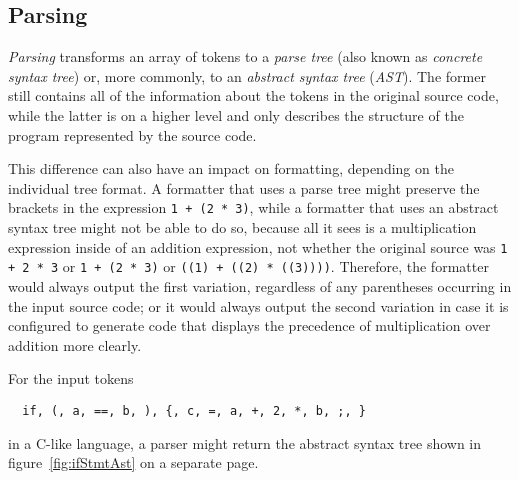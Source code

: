 \subsection{Parsing}
\textit{Parsing} transforms an array of tokens to a \textit{parse tree} (also known as
\textit{concrete syntax tree}) or, more commonly, to an \textit{abstract syntax tree} (\textit{AST}).
The former still contains all of the information about the tokens in the original source code,
while the latter is on a higher level and only describes
the structure of the program represented by the source code.

This difference can also have an impact on formatting, depending on the individual tree format.
A formatter that uses a parse tree might preserve the brackets in the expression
\texttt{1 + (2 * 3)}, while a formatter that uses an abstract syntax tree might
not be able to do so, because all it sees is a multiplication expression inside of an addition expression,
not whether the original source was \texttt{1 + 2 * 3} or \texttt{1 + (2 * 3)}
or \texttt{((1) + ((2) * ((3))))}.
Therefore, the formatter would always output the first variation,
regardless of any parentheses occurring in the input source code;
or it would always output the second variation in case it is configured to generate code
that displays the precedence of multiplication over addition more clearly.

For the input tokens
\begin{verbatim}
  if, (, a, ==, b, ), {, c, =, a, +, 2, *, b, ;, }
\end{verbatim}
in a C-like language, a parser might return the abstract syntax tree
shown in figure~\ref{fig:ifStmtAst} on a separate page.

